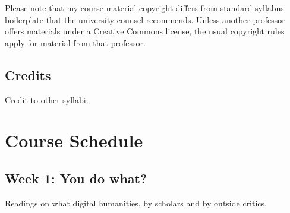 \documentclass[]{article}
\begin{document}
Please note that my course material copyright differs from standard
syllabus boilerplate that the university counsel recommends. Unless
another professor offers materials under a Creative Commons license, the
usual copyright rules apply for material from that professor.

\subsection{Credits}\label{credits}

Credit to other syllabi.

\section{Course Schedule}\label{course-schedule}

\subsection{Week 1: You do what?}\label{week-1-you-do-what}

Readings on what digital humanities, by scholars and by outside critics.
\end{document}
